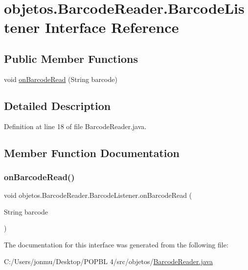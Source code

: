 \hypertarget{interfaceobjetos_1_1_barcode_reader_1_1_barcode_listener}{}\section{objetos.\+Barcode\+Reader.\+Barcode\+Listener Interface Reference}
\label{interfaceobjetos_1_1_barcode_reader_1_1_barcode_listener}
\subsection*{Public Member Functions}
\begin{DoxyCompactItemize}
\item 
void \mbox{\hyperlink{interfaceobjetos_1_1_barcode_reader_1_1_barcode_listener_aca5208abcd950196a737408a2368c32f}{on\+Barcode\+Read}} (String barcode)
\end{DoxyCompactItemize}


\subsection{Detailed Description}


Definition at line 18 of file Barcode\+Reader.\+java.



\subsection{Member Function Documentation}
\mbox{\label{interfaceobjetos_1_1_barcode_reader_1_1_barcode_listener_aca5208abcd950196a737408a2368c32f}} 
\subsubsection{\texorpdfstring{on\+Barcode\+Read()}{onBarcodeRead()}}
{\footnotesize\ttfamily void objetos.\+Barcode\+Reader.\+Barcode\+Listener.\+on\+Barcode\+Read (\begin{DoxyParamCaption}\item[{String}]{barcode }\end{DoxyParamCaption})}



The documentation for this interface was generated from the following file\+:\begin{DoxyCompactItemize}
\item 
C\+:/\+Users/jonmu/\+Desktop/\+P\+O\+P\+B\+L 4/src/objetos/\mbox{\hyperlink{_barcode_reader_8java}{Barcode\+Reader.\+java}}\end{DoxyCompactItemize}
